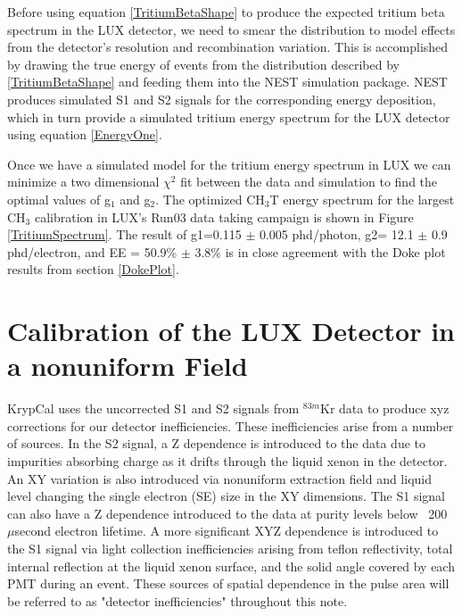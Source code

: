\documentclass[a4paper,12pt]{article}
\begin{document}
{Before using equation \ref{TritiumBetaShape} to produce the expected tritium beta spectrum in the LUX detector, we need to smear the distribution to model effects from the detector's resolution and recombination variation.  This is accomplished by drawing the true energy of events from the distribution described by \ref{TritiumBetaShape} and feeding them into the NEST simulation package.  NEST produces simulated S1 and S2 signals for the corresponding energy deposition, which in turn provide a simulated tritium energy spectrum for the LUX detector using equation \ref{EnergyOne}.

Once we have a simulated model for the tritium energy spectrum in LUX we can minimize a two dimensional $\chi^2$ fit between the data and simulation to find the optimal values of g$_1$ and g$_2$.  The optimized CH$_3$T energy spectrum for the largest CH$_3$ calibration in LUX's Run03 data taking campaign is shown in Figure \ref{TritiumSpectrum}.	The result of g1=0.115 $\pm$ 0.005 phd/photon, g2= 12.1 $\pm$ 0.9 phd/electron, and EE = 50.9\% $\pm$ 3.8\% is in close agreement with the Doke plot results from section \ref{DokePlot}.


\section{Calibration of the LUX Detector in a nonuniform Field} \label{Run04Corrections}

KrypCal uses the uncorrected S1 and S2 signals from $^{83m}$Kr data to produce xyz corrections for our detector inefficiencies.  These inefficiencies arise from a number of sources.  In the S2 signal, a Z dependence is introduced to the data due to impurities absorbing charge as it drifts through the liquid xenon in the detector.  An XY variation is also introduced via nonuniform extraction field and liquid level changing the single electron (SE) size in the XY dimensions.  The S1 signal can also have a Z dependence introduced to the data at purity levels below ~200 $\mu$second electron lifetime.  A more significant XYZ dependence is introduced to the S1 signal via light collection inefficiencies arising from teflon reflectivity, total internal reflection at the liquid xenon surface, and the solid angle covered by each PMT during an event.  These sources of spatial dependence in the pulse area will be referred to as "detector inefficiencies" throughout this note.

}
\end{document}
